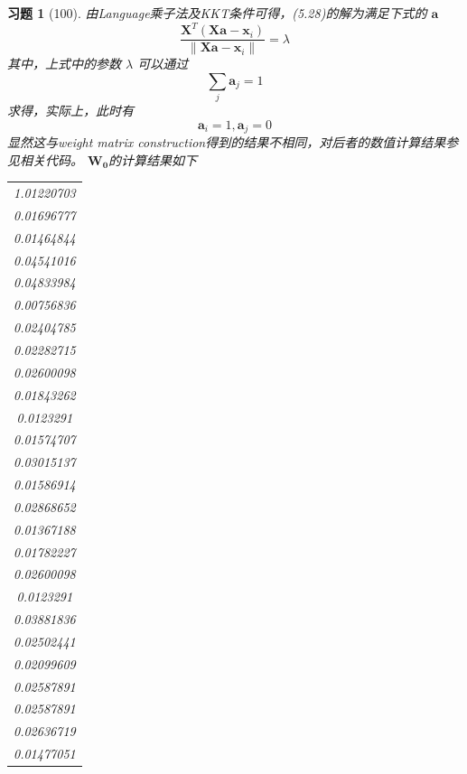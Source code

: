 \documentclass[a4paper, UTF8]{ctexart}
\newtheorem*{exercise}{\textbf{习题}}
\begin{document}
  \begin{exercise}[100]
    由Language乘子法及KKT条件可得，(5.28)的解为满足下式的 $\mathbf{a}$
    \begin{equation}
      \frac{\mathbf{X}^T \left( \mathbf{X}\mathbf{a} - \mathbf{x}_i \right)}{\lVert \mathbf{X} \mathbf{a} - \mathbf{x}_i \rVert} = \lambda
    \end{equation}
  其中，上式中的参数 $\lambda$ 可以通过
  \begin{equation}
    \sum_j \mathbf{a}_j = 1
  \end{equation}
  求得，实际上，此时有
  \begin{equation}
    \mathbf{a}_i = 1, \mathbf{a}_j = 0
  \end{equation}
  显然这与weight matrix construction得到的结果不相同，对后者的数值计算结果参见相关代码。 $\mathbf{W_0}$的计算结果如下
  \begin{table}[htbp!]
    \centering
    \begin{tabular}{c}
      1.01220703 \\
       0.01696777 \\
       0.01464844 \\
       0.04541016 \\
       0.04833984 \\
       0.00756836 \\
       0.02404785 \\
       0.02282715 \\
       0.02600098 \\
       0.01843262 \\
       0.0123291  \\
       0.01574707 \\
       0.03015137 \\
       0.01586914 \\
       0.02868652 \\
       0.01367188 \\
       0.01782227 \\
       0.02600098 \\
       0.0123291  \\
       0.03881836 \\
       0.02502441 \\
       0.02099609 \\
       0.02587891 \\
       0.02587891 \\
       0.02636719 \\
       0.01477051 \\

\end{tabular}
\end{table}
\end{exercise}
\end{document}
